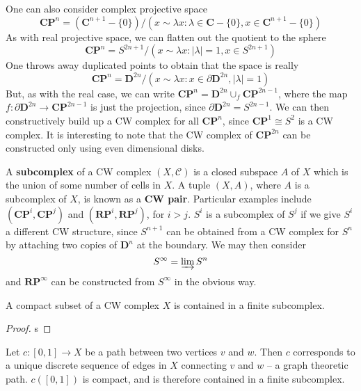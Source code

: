 \begin{example}
    One can also consider complex projective space
    \[ \mathbf{C} \mathbf{P}^n = (\mathbf{C}^{n+1} - \{ 0 \}) / {(x \sim \lambda x : \lambda \in \mathbf{C} - \{ 0 \}, x \in \mathbf{C}^{n+1} - \{ 0 \})} \]
    As with real projective space, we can flatten out the quotient to the sphere
    \[ \mathbf{C} \mathbf{P}^n = S^{2n+1} / {(x \sim \lambda x : |\lambda| = 1, x \in S^{2n + 1})} \]
    One throws away duplicated points to obtain that the space is really
    \[ \mathbf{C} \mathbf{P}^n = \mathbf{D}^{2n} / {(x \sim \lambda x : x \in \partial \mathbf{D}^{2n}, |\lambda| = 1)} \]
    But, as with the real case, we can write $\mathbf{C} \mathbf{P}^n = \mathbf{D}^{2n} \cup_f \mathbf{C} \mathbf{P}^{2n - 1}$, where the map $f: \partial \mathbf{D}^{2n} \to \mathbf{C} \mathbf{P}^{2n-1}$ is just the projection, since $\partial \mathbf{D}^{2n} = S^{2n-1}$. We can then constructively build up a CW complex for all $\mathbf{C} \mathbf{P}^n$, since $\mathbf{C} \mathbf{P}^1 \cong S^2$ is a CW complex. It is interesting to note that the CW complex of $\mathbf{C} \mathbf{P}^{2n}$ can be constructed only using even dimensional disks.
\end{example}

A {\bf subcomplex} of a CW complex $(X,\mathcal{C})$ is a closed subspace $A$ of $X$ which is the union of some number of cells in $X$. A tuple $(X,A)$, where $A$ is a subcomplex of $X$, is known as a {\bf CW pair}. Particular examples include $(\mathbf{C} \mathbf{P}^i, \mathbf{C} \mathbf{P}^j)$ and $(\mathbf{R} \mathbf{P}^i, \mathbf{R} \mathbf{P}^j)$, for $i > j$. $S^i$ is a subcomplex of $S^j$ if we give $S^i$ a different CW structure, since $S^{n+1}$ can be obtained from a CW complex for $S^n$ by attaching two copies of $\mathbf{D}^n$ at the boundary. We may then consider
%
\[ S^\infty = \varinjlim S^n \]
%
and $\mathbf{R} \mathbf{P}^\infty$ can be constructed from $S^\infty$ in the obvious way.

\begin{theorem}
    A compact subset of a CW complex $X$ is contained in a finite subcomplex.
\end{theorem}
\begin{proof}
    s
\end{proof}

\begin{example}
    Let $c:[0,1] \to X$ be a path between two vertices $v$ and $w$. Then $c$ corresponds to a unique discrete sequence of edges in $X$ connecting $v$ and $w$ -- a graph theoretic path. $c([0,1])$ is compact, and is therefore contained in a finite subcomplex.
\end{example}

